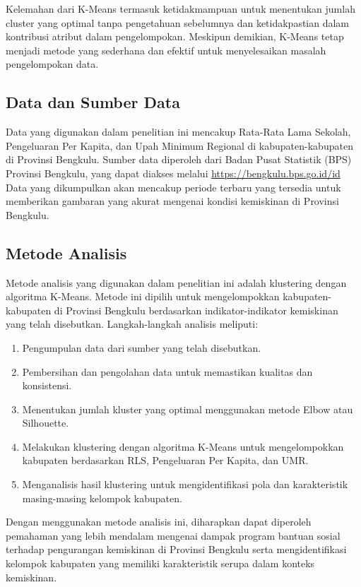 \documentclass{article}
\begin{document}
Kelemahan dari K-Means termasuk ketidakmampuan untuk menentukan jumlah cluster yang optimal tanpa pengetahuan sebelumnya dan ketidakpastian dalam kontribusi atribut dalam pengelompokan. Meskipun demikian, K-Means tetap menjadi metode yang sederhana dan efektif untuk menyelesaikan masalah pengelompokan data.



\subsection{Data dan Sumber Data}

Data yang digunakan dalam penelitian ini mencakup Rata-Rata Lama Sekolah, Pengeluaran Per Kapita, dan Upah Minimum Regional di kabupaten-kabupaten di Provinsi Bengkulu. Sumber data diperoleh dari Badan Pusat Statistik (BPS) Provinsi Bengkulu, yang dapat diakses melalui \url{https://bengkulu.bps.go.id/id} Data yang dikumpulkan akan mencakup periode terbaru yang tersedia untuk memberikan gambaran yang akurat mengenai kondisi kemiskinan di Provinsi Bengkulu.

\subsection{Metode Analisis}

Metode analisis yang digunakan dalam penelitian ini adalah klustering dengan algoritma K-Means. Metode ini dipilih untuk mengelompokkan kabupaten-kabupaten di Provinsi Bengkulu berdasarkan indikator-indikator kemiskinan yang telah disebutkan. Langkah-langkah analisis meliputi:

\begin{enumerate}
    \item Pengumpulan data dari sumber yang telah disebutkan.
    \item Pembersihan dan pengolahan data untuk memastikan kualitas dan konsistensi.
    \item Menentukan jumlah kluster yang optimal menggunakan metode Elbow atau Silhouette.
    \item Melakukan klustering dengan algoritma K-Means untuk mengelompokkan kabupaten berdasarkan RLS, Pengeluaran Per Kapita, dan UMR.
    \item Menganalisis hasil klustering untuk mengidentifikasi pola dan karakteristik masing-masing kelompok kabupaten.
\end{enumerate}

Dengan menggunakan metode analisis ini, diharapkan dapat diperoleh pemahaman yang lebih mendalam mengenai dampak program bantuan sosial terhadap pengurangan kemiskinan di Provinsi Bengkulu serta mengidentifikasi kelompok kabupaten yang memiliki karakteristik serupa dalam konteks kemiskinan.
\end{document}
